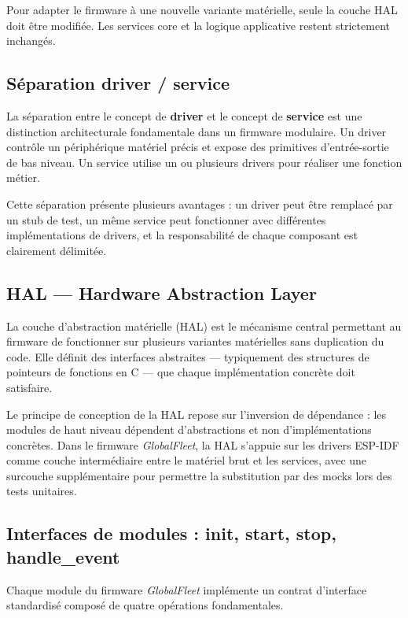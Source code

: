 \noindent
Pour adapter le firmware à une nouvelle variante matérielle, seule
la couche HAL doit être modifiée. Les services core et la logique
applicative restent strictement inchangés.

\subsection{Séparation driver / service}
\label{subsec:driver_service}

La séparation entre le concept de \textbf{driver} et le concept de
\textbf{service} est une distinction architecturale fondamentale dans
un firmware modulaire. Un driver contrôle un périphérique matériel
précis et expose des primitives d'entrée-sortie de bas niveau. Un
service utilise un ou plusieurs drivers pour réaliser une fonction
métier.

Cette séparation présente plusieurs avantages : un driver peut être
remplacé par un stub de test, un même service peut fonctionner avec
différentes implémentations de drivers, et la responsabilité de chaque
composant est clairement délimitée.

\subsection{HAL — Hardware Abstraction Layer}
\label{subsec:hal}

La couche d'abstraction matérielle (HAL) est le mécanisme central
permettant au firmware de fonctionner sur plusieurs variantes
matérielles sans duplication du code. Elle définit des interfaces
abstraites — typiquement des structures de pointeurs de fonctions
en C — que chaque implémentation concrète doit satisfaire.

Le principe de conception de la HAL repose sur l'inversion de
dépendance : les modules de haut niveau dépendent d'abstractions
et non d'implémentations concrètes. Dans le firmware
\textit{GlobalFleet}, la HAL s'appuie sur les drivers ESP-IDF comme
couche intermédiaire entre le matériel brut et les services, avec
une surcouche supplémentaire pour permettre la substitution par des
mocks lors des tests unitaires.

\subsection{Interfaces de modules : init, start, stop, handle\_event}
\label{subsec:interfaces}

Chaque module du firmware \textit{GlobalFleet} implémente un contrat
d'interface standardisé composé de quatre opérations fondamentales.

